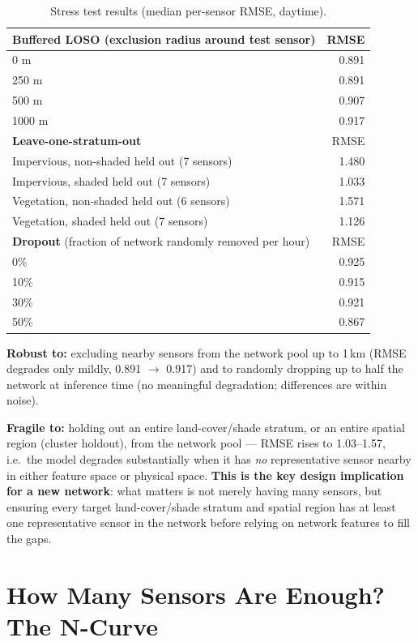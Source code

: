 \documentclass[11pt]{article}
\begin{document}
\begin{table}[H]
  \centering
  \caption{Stress test results (median per-sensor RMSE, daytime).}
  \label{tab:stress}
  \begin{tabular}{lr}
    \toprule
    \textbf{Buffered LOSO} (exclusion radius around test sensor) & RMSE \\
    \midrule
    0 m    & 0.891 \\
    250 m  & 0.891 \\
    500 m  & 0.907 \\
    1000 m & 0.917 \\
    \midrule
    \textbf{Leave-one-stratum-out} & RMSE \\
    \midrule
    Impervious, non-shaded held out (7 sensors) & 1.480 \\
    Impervious, shaded held out (7 sensors)     & 1.033 \\
    Vegetation, non-shaded held out (6 sensors) & 1.571 \\
    Vegetation, shaded held out (7 sensors)     & 1.126 \\
    \midrule
    \textbf{Dropout} (fraction of network randomly removed per hour) & RMSE \\
    \midrule
    0\%  & 0.925 \\
    10\% & 0.915 \\
    30\% & 0.921 \\
    50\% & 0.867 \\
    \bottomrule
  \end{tabular}
\end{table}

\textbf{Robust to:} excluding nearby sensors from the network pool up to
1\,km (RMSE degrades only mildly, 0.891 $\to$ 0.917) and to randomly
dropping up to half the network at inference time (no meaningful
degradation; differences are within noise).

\textbf{Fragile to:} holding out an entire land-cover/shade stratum, or an
entire spatial region (cluster holdout), from the network pool --- RMSE
rises to 1.03--1.57, i.e.\ the model degrades substantially when it has
\emph{no} representative sensor nearby in either feature space or physical
space. \textbf{This is the key design implication for a new network}: what
matters is not merely having many sensors, but ensuring every target
land-cover/shade stratum and spatial region has at least one representative
sensor in the network before relying on network features to fill the gaps.

\section{How Many Sensors Are Enough? The N-Curve}
\end{document}
